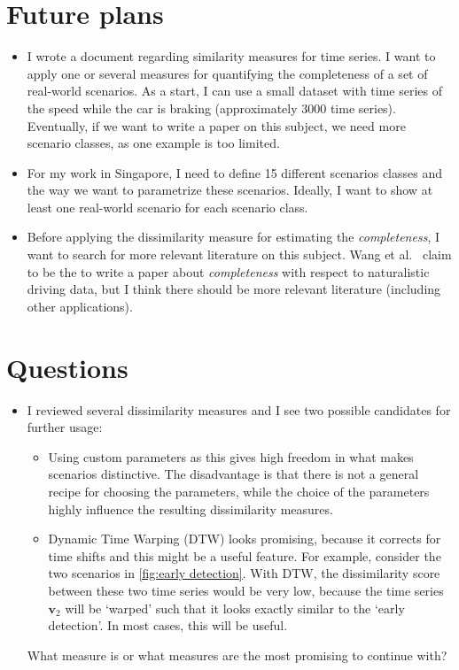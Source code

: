 \documentclass[10pt,final,a4paper,oneside,onecolumn]{article}
\begin{document}
\section{Future plans}

\begin{itemize}
	\item I wrote a document regarding similarity measures for time series. I want to apply one or several measures for quantifying the completeness of a set of real-world scenarios. As a start, I can use a small dataset with time series of the speed while the car is braking (approximately 3000 time series). Eventually, if we want to write a paper on this subject, we need more scenario classes, as one example is too limited.
	\item For my work in Singapore, I need to define 15 different scenarios classes and the way we want to parametrize these scenarios. Ideally, I want to show at least one real-world scenario for each scenario class.
	\item Before applying the dissimilarity measure for estimating the \emph{completeness}, I want to search for more relevant literature on this subject. Wang et al.~\cite{wang2017much} claim to be the to write a paper about \emph{completeness} with respect to naturalistic driving data, but I think there should be more relevant literature (including other applications).
\end{itemize}

\section{Questions}

\begin{itemize}
	\item I reviewed several dissimilarity measures and I see two possible candidates for further usage:
	\begin{itemize}
		\item Using custom parameters as this gives high freedom in what makes scenarios distinctive. The disadvantage is that there is not a general recipe for choosing the parameters, while the choice of the parameters highly influence the resulting dissimilarity measures.
		\item Dynamic Time Warping (DTW) looks promising, because it corrects for time shifts and this might be a useful feature. For example, consider the two scenarios in \cref{fig:early detection}. With DTW, the dissimilarity score between these two time series would be very low, because the time series $\textbf{v}_2$ will be `warped' such that it looks exactly similar to the `early detection'. In most cases, this will be useful.
	\end{itemize}
	What measure is or what measures are the most promising to continue with?
\end{itemize}
\end{document}
